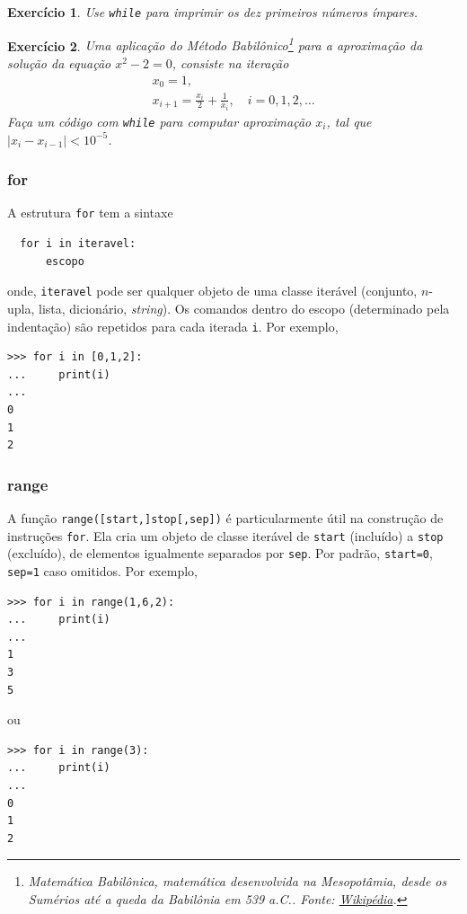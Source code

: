 \documentclass[12pt]{article}
\newtheorem{exr}{Exercício}[section]
\begin{document}
\begin{exr}
  Use \lstinline+while+ para imprimir os dez primeiros números ímpares.
\end{exr}

\begin{exr}
  Uma aplicação do Método Babilônico\footnote{Matemática Babilônica, matemática desenvolvida na Mesopotâmia, desde os Sumérios até a queda da Babilônia em 539 a.C.. Fonte: \href{https://pt.wikipedia.org/wiki/Matem\%C3\%A1tica\_babil\%C3\%B4nica}{Wikipédia}.} para a aproximação da solução da equação $x^2-2 = 0$, consiste na iteração
  \begin{gather}
    x_0 = 1,\\
    x_{i+1} = \frac{x_i}{2} + \frac{1}{x_i},\quad i=0,1,2,\ldots
  \end{gather}
  Faça um código com \lstinline+while+ para computar aproximação $x_{i}$, tal que $|x_{i}-x_{i-1}|<10^{-5}$.
\end{exr}

\subsubsection{for}

A estrutura \lstinline+for+ tem a sintaxe
\begin{lstlisting}
  for i in iteravel:
      escopo
\end{lstlisting}
onde, \lstinline+iteravel+ pode ser qualquer objeto de uma classe iterável (conjunto, $n$-upla, lista, dicionário, {\it string}). Os comandos dentro do escopo (determinado pela indentação) são repetidos para cada iterada \lstinline+i+. Por exemplo,
\begin{lstlisting}
>>> for i in [0,1,2]:
...     print(i)
... 
0
1
2
\end{lstlisting}

\subsubsection{range}

A função {\python} \lstinline+range([start,]stop[,sep])+ é particularmente útil na construção de instruções \lstinline+for+. Ela cria um objeto de classe iterável de \lstinline+start+ (incluído) a \lstinline+stop+ (excluído), de elementos igualmente separados por \lstinline+sep+. Por padrão, \lstinline+start=0+, \lstinline+sep=1+ caso omitidos. Por exemplo,
\begin{lstlisting}
>>> for i in range(1,6,2):
...     print(i)
... 
1
3
5
\end{lstlisting}
ou
\begin{lstlisting}
>>> for i in range(3):
...     print(i)
... 
0
1
2
\end{lstlisting}
\end{document}

